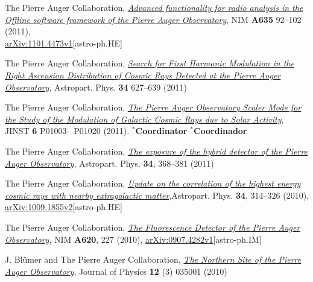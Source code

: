 \begin{etaremune}
\item {}The Pierre Auger Collaboration,
\href{http://dx.doi.org/10.1016/j.nima.2011.01.049}{{\emph{Advanced
functionality for radio analysis in the Offline software framework of the
Pierre Auger Observatory}}}, NIM {\bf A635} 92--102
(2011),\\
\href{http://arxiv.org/abs/1101.4473}{arXiv:1101.4473v1}[astro-ph.HE]

\item {}The Pierre Auger Collaboration,
\href{http://dx.doi.org/10.1016/j.astropartphys.2010.12.007}{\emph{Search for
First Harmonic Modulation in the Right Ascension Distribution of Cosmic Rays
Detected at the Pierre Auger Observatory}}, Astropart. Phys. {\bf 34} 627--639
(2011)

\item {}The Pierre Auger Collaboration,
\href{http://dx.doi.org/10.1088/1748-0221/6/01/P01003}{\emph{The Pierre Auger
Observatory Scaler Mode for the Study of the Modulation of Galactic Cosmic Rays
due to Solar Activity}}, JINST {\bf 6} P01003--
P01020 (2011). \ifeng $^*${\bf{Coordinator}} \else $^*${\bf{Coordinador}} \fi

\item {}The Pierre Auger Collaboration,
\href{http://dx.doi.org/10.1016/j.astropartphys.2010.10.001}{\emph{The exposure
of the hybrid detector of the Pierre Auger Observatory}}, Astropart. Phys. {\bf
34}, 368--381 (2011)

\item {}The Pierre Auger Collaboration,
\href{http://dx.doi.org/10.1016/j.astropartphys.2010.08.010}{\emph{Update on
the correlation of the highest energy cosmic rays with nearby extragalactic
matter}},Astropart. Phys. {\bf 34}, 314--326 (2010),
\href{http://arxiv.org/abs/1009.1855}{arXiv:1009.1855v2}[astro-ph.HE]

\item {}The Pierre Auger Collaboration,
\href{http://dx.doi.org/10.1016/j.nima.2010.04.023}{\emph{The Fluorescence
Detector of the Pierre Auger Observatory}}, NIM {\bf A620}, 227 (2010),
\href{http://arxiv.org/abs/0907.4282}{arXiv:0907.4282v1}[astro-ph.IM]

\item {}J. Bl\"umer and The Pierre Auger Collaboration,
\href{http://dx.doi.org/10.1088/1367-2630/12/3/035001}{\emph{The Northern Site
of the Pierre Auger Observatory}}, Journal of Physics {\bf 12} (3) 035001
(2010)


\end{etaremune}
